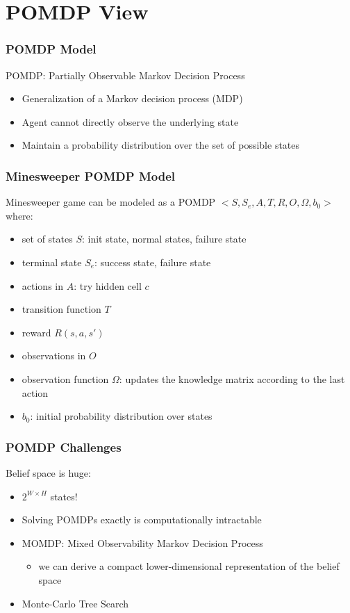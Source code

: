 \documentclass[aspectratio=169]{beamer}
\begin{document}

\section{POMDP View}

\begin{frame}
	\frametitle{POMDP Model}
	POMDP: Partially Observable Markov Decision Process
	\begin{itemize}
	    \item Generalization of a Markov decision process (MDP)
	    \item Agent cannot directly observe the underlying state
	    \item Maintain a probability distribution over the set of possible states
	\end{itemize}
\end{frame}

\begin{frame}
	\frametitle{Minesweeper POMDP Model}
	Minesweeper game can be modeled as a POMDP $<S, S_e, A, T, R, O, \Omega, b_0>$ where:

	\begin{itemize}
		\item set of states $S$: init state, normal states, failure state
		\item terminal state $S_e$: success state, failure state
		\item actions in $A$: try hidden cell $c$
		\item transition function $T$
		\item reward $R(s, a, s')$
		\item observations in $O$
		\item observation function $\Omega$: updates the knowledge matrix according to the last action
		\item $b_0$: initial probability distribution over states
	\end{itemize}
\end{frame}

\begin{frame}
	\frametitle{POMDP Challenges}
	Belief space is huge: 
	\begin{itemize}
		\item $2^{W \times H}$ states!
		\item Solving POMDPs exactly is computationally intractable
		\item MOMDP: Mixed Observability Markov Decision Process
		\begin{itemize}
			\item we can derive a compact lower-dimensional representation of the belief space
		\end{itemize}
		\item Monte-Carlo Tree Search
	\end{itemize}
\end{frame}
\end{document}
